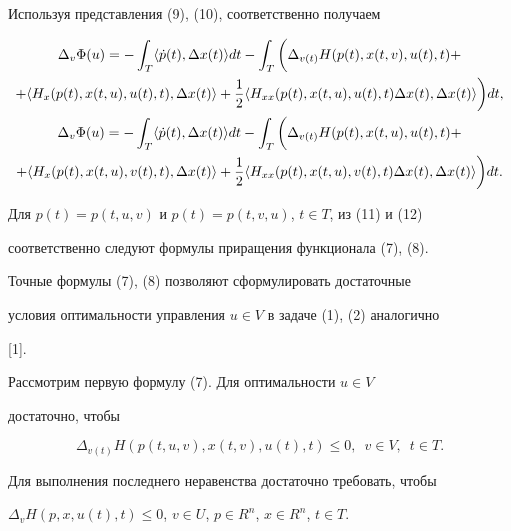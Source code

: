 Используя представления (9), (10), соответственно получаем


\begin{gather}


\Delta_v\Phi(u)=-\int_T \la\Dot p(t),\Delta x(t)\ra dt-


\int_T\bigg(\Delta_{v(t)}H(p(t),x(t,v),u(t),t) +\notag \\


%


+\la H_x(p(t),x(t,u),u(t),t),\Delta x(t)\ra +\frac{1}{2}


\la H_{xx}(p(t),x(t,u),u(t),t)\Delta x(t),\Delta x(t)\ra


\bigg) dt,\\


%


\Delta_v\Phi(u)=-\int_T \la\Dot p(t),\Delta x(t)\ra dt-


\int_T\bigg(\Delta_{v(t)}H(p(t),x(t,u),u(t),t) +\notag \\


%


+\la H_x(p(t),x(t,u),v(t),t),\Delta x(t)\ra +\frac{1}{2}


\la H_{xx}(p(t),x(t,u),v(t),t)\Delta x(t),\Delta x(t)\ra


\bigg) dt.\end{gather}


Для $p(t)=p(t,u,v)$ и $p(t)=p(t,v,u)$, $t\in T$, из (11) и (12) 


соответственно следуют формулы приращения функционала (7), (8).





Точные формулы (7), (8) позволяют сформулировать достаточные 


условия оптимальности управления $u\in V$ в задаче (1), (2) аналогично 


[1].





Рассмотрим первую формулу (7). Для оптимальности $u\in V$


достаточно, чтобы


$$


\Delta_{v(t)}H(p(t,u,v),x(t,v),u(t),t)\le0, \ \;


v\in V,\ \; t\in T.


$$


Для выполнения последнего неравенства достаточно требовать, чтобы


$\Delta_v H(p,x,u(t),t)\le0$, $v\in U$, $p\in R^n$, $x\in R^n$, $t\in T$.


